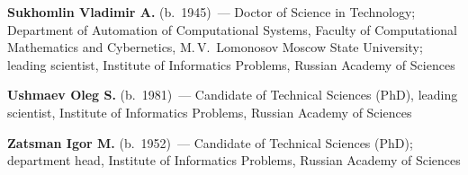 \begin{multicols}{2}





\vspace*{10pt}
\noindent
\textbf{Sukhomlin Vladimir A.} (b.\ 1945)~--- Doctor of Science in Technology; 
Department of Automation of Computational Systems,
Faculty of  Computational
Mathematics and Cybernetics, M.\,V.~Lomonosov Moscow State University;
leading scientist,  Institute of Informatics Problems,  Russian Academy of Sciences







\vspace*{10pt}



\noindent %
\textbf{Ushmaev Oleg S.} (b.\ 1981)~---
Candidate of Technical Sciences (PhD), leading scientist,
Institute of Informatics Problems,  Russian Academy of Sciences

\vspace*{10pt}

\noindent
\textbf{Zatsman Igor M.} (b.\ 1952)~--- Candidate of Technical Sciences
(PhD); department head, Institute
of Informatics Problems, Russian Academy of Sciences


\end{multicols}